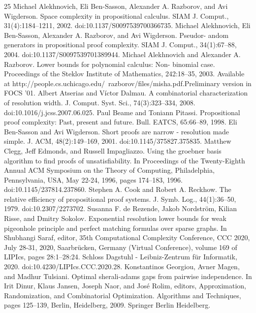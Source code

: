 \documentclass[10pt,a4paper]{article}
\begin{document}
\begin{thebibliography}{25}
 Michael Alekhnovich, Eli Ben-Sasson, Alexander A. Razborov, and Avi Wigderson. Space complexity in propositional calculus. SIAM J. Comput., 31(4):1184–1211, 2002. doi:10.1137/S0097539700366735.
 Michael Alekhnovich, Eli Ben-Sasson, Alexander A. Razborov, and Avi Wigderson. Pseudor- andom generators in propositional proof complexity. SIAM J. Comput., 34(1):67–88, 2004. doi:10.1137/S0097539701389944.
 Michael Alekhnovich and Alexander A. Razborov. Lower bounds for polynomial calculus: Non- binomial case. Proceedings of the Steklov Institute of Mathematics, 242:18–35, 2003. Available at http://people.cs.uchicago.edu/~razborov/files/misha.pdf.Preliminary version in FOCS ’01.
 Albert Atserias and Víctor Dalmau. A combinatorial characterization of resolution width. J. Comput. Syst. Sci., 74(3):323–334, 2008. doi:10.1016/j.jcss.2007.06.025.
 Paul Beame and Toniann Pitassi. Propositional proof complexity: Past, present and future. Bull. EATCS, 65:66–89, 1998.
 Eli Ben-Sasson and Avi Wigderson. Short proofs are narrow - resolution made simple. J. ACM, 48(2):149–169, 2001. doi:10.1145/375827.375835.
 Matthew Clegg, Jeff Edmonds, and Russell Impagliazzo. Using the groebner basis algorithm to find proofs of unsatisfiability. In Proceedings of the Twenty-Eighth Annual ACM Symposium on the Theory of Computing, Philadelphia, Pennsylvania, USA, May 22-24, 1996, pages 174–183, 1996. doi:10.1145/237814.237860.
 Stephen A. Cook and Robert A. Reckhow. The relative efficiency of propositional proof systems. J. Symb. Log., 44(1):36–50, 1979. doi:10.2307/2273702.
 Susanna F. de Rezende, Jakob Nordström, Kilian Risse, and Dmitry Sokolov. Exponential resolution lower bounds for weak pigeonhole principle and perfect matching formulas over sparse graphs. In Shubhangi Saraf, editor, 35th Computational Complexity Conference, CCC 2020, July 28-31, 2020, Saarbrücken, Germany (Virtual Conference), volume 169 of LIPIcs, pages 28:1–28:24. Schloss Dagstuhl - Leibniz-Zentrum für Informatik, 2020. doi:10.4230/LIPIcs.CCC.2020.28.
 Konstantinos Georgiou, Avner Magen, and Madhur Tulsiani. Optimal sherali-adams gaps from pairwise independence. In Irit Dinur, Klaus Jansen, Joseph Naor, and José Rolim, editors, Approximation, Randomization, and Combinatorial Optimization. Algorithms and Techniques, pages 125–139, Berlin, Heidelberg, 2009. Springer Berlin Heidelberg.

\end{thebibliography}
\end{document}

